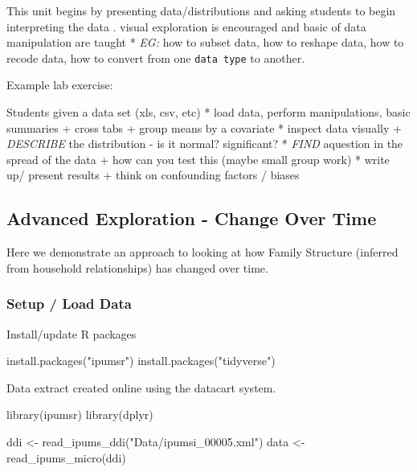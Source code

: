 \documentclass[
]{book}
\newenvironment{Shaded}{\begin{snugshade}}{\end{snugshade}}
\newcommand{\FunctionTok}[1]{\textcolor[rgb]{0.00,0.00,0.00}{#1}}
\newcommand{\NormalTok}[1]{#1}
\newcommand{\OtherTok}[1]{\textcolor[rgb]{0.56,0.35,0.01}{#1}}
\newcommand{\StringTok}[1]{\textcolor[rgb]{0.31,0.60,0.02}{#1}}
\begin{document}
This unit begins by presenting data/distributions and asking students to begin interpreting the data . visual exploration is encouraged and basic of data manipulation are taught
* \emph{EG:} how to subset data, how to reshape data, how to recode data, how to convert from one \texttt{data\ type} to another.

Example lab exercise:

Students given a data set (xls, csv, etc)
* load data, perform manipulations, basic summaries
+ cross tabs
+ group means by a covariate
* inspect data visually
+ \emph{DESCRIBE} the distribution - is it normal? significant?
* \emph{FIND} aquestion in the spread of the data
+ how can you test this (maybe small group work)
* write up/ present results
+ think on confounding factors / biases

\hypertarget{advanced-exploration---change-over-time}{%
\subsection*{Advanced Exploration - Change Over Time}\label{advanced-exploration---change-over-time}}

Here we demonstrate an approach to looking at how Family Structure (inferred from household relationships) has changed over time.

\hypertarget{setup-load-data}{%
\subsubsection*{Setup / Load Data}\label{setup-load-data}}

Install/update R packages

\begin{Shaded}
\begin{Highlighting}[]
\FunctionTok{install.packages}\NormalTok{(}\StringTok{"ipumsr"}\NormalTok{)}
\FunctionTok{install.packages}\NormalTok{(}\StringTok{"tidyverse"}\NormalTok{)}
\end{Highlighting}
\end{Shaded}

Data extract created online using the datacart system.

\begin{Shaded}
\begin{Highlighting}[]
\FunctionTok{library}\NormalTok{(ipumsr)}
\FunctionTok{library}\NormalTok{(dplyr)}


\NormalTok{ddi }\OtherTok{\textless{}{-}} \FunctionTok{read\_ipums\_ddi}\NormalTok{(}\StringTok{"Data/ipumsi\_00005.xml"}\NormalTok{)}
\NormalTok{data }\OtherTok{\textless{}{-}} \FunctionTok{read\_ipums\_micro}\NormalTok{(ddi)}
\end{Highlighting}
\end{Shaded}
\end{document}
